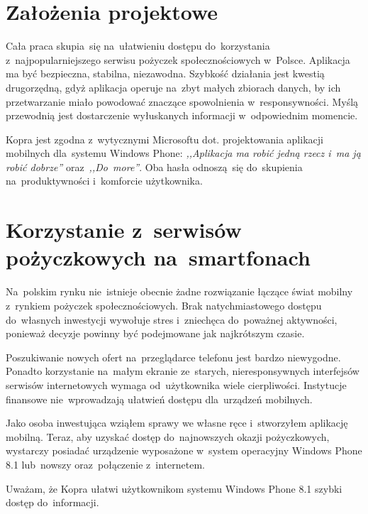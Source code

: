 \documentclass[a4paper,twoside,titlepage,openright]{book}
\begin{document}
\section*{Założenia projektowe}

Cała praca skupia~się na~ułatwieniu dostępu do~korzystania z~najpopularniejszego serwisu pożyczek społecznościowych w~Polsce. Aplikacja ma być bezpieczna, stabilna, niezawodna. Szybkość działania jest kwestią drugorzędną, gdyż aplikacja operuje na~zbyt małych zbiorach danych, by ich przetwarzanie miało powodować znaczące spowolnienia w~responsywności. Myślą przewodnią jest dostarczenie wyłuskanych informacji w~odpowiednim momencie. 

Kopra jest zgodna z~wytycznymi Microsoftu dot. projektowania aplikacji mobilnych dla~systemu Windows Phone: \textit{,,Aplikacja ma robić jedną rzecz i~ma ją robić dobrze''}\cite{wpDesign} oraz~\textit{,,Do~more''}\cite{doMore}. Oba hasła odnoszą~się do~skupienia na~produktywności i~komforcie użytkownika. 

\section*{Korzystanie z~serwisów pożyczkowych na~smartfonach}

Na~polskim rynku nie~istnieje obecnie żadne rozwiązanie łączące świat mobilny z~rynkiem pożyczek społecznościowych. Brak natychmiastowego dostępu do~własnych inwestycji wywołuje stres i~zniechęca do~poważnej aktywności, ponieważ decyzje powinny być podejmowane jak najkrótszym czasie. 

Poszukiwanie nowych ofert na~przeglądarce telefonu jest bardzo niewygodne. Ponadto korzystanie na~małym ekranie ze~starych, nieresponsywnych interfejsów serwisów internetowych wymaga od~użytkownika wiele cierpliwości. Instytucje finansowe nie~wprowadzają ułatwień dostępu dla~urządzeń mobilnych. 

Jako osoba inwestująca wziąłem sprawy we własne ręce i~stworzyłem aplikację mobilną. Teraz, aby uzyskać dostęp do~najnowszych okazji pożyczkowych, wystarczy posiadać urządzenie wyposażone w~system operacyjny Windows Phone 8.1 lub~nowszy oraz~połączenie z~internetem.

Uważam, że Kopra ułatwi użytkownikom systemu Windows Phone 8.1 szybki dostęp do~informacji.
\end{document}
